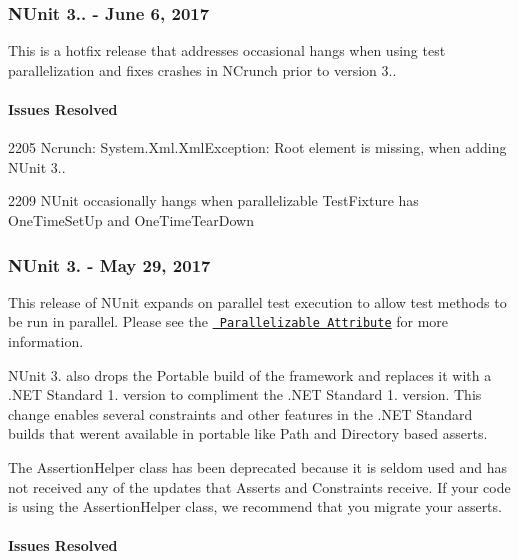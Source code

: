 \subsubsection*{N\+Unit 3.. -\/ June 6, 2017}

This is a hotfix release that addresses occasional hangs when using test parallelization and fixes crashes in N\+Crunch prior to version 3..

\paragraph*{Issues Resolved}


\begin{DoxyItemize}
\item 2205 Ncrunch\+: System.\+Xml.\+Xml\+Exception\+: Root element is missing, when adding N\+Unit 3..
\item 2209 N\+Unit occasionally hangs when parallelizable Test\+Fixture has One\+Time\+Set\+Up and One\+Time\+Tear\+Down
\end{DoxyItemize}

\subsubsection*{N\+Unit 3. -\/ May 29, 2017}

This release of N\+Unit expands on parallel test execution to allow test methods to be run in parallel. Please see the \href{https://github.com/nunit/docs/wiki/Parallelizable-Attribute}{\texttt{ Parallelizable Attribute}} for more information.

N\+Unit 3. also drops the Portable build of the framework and replaces it with a .N\+ET Standard 1. version to compliment the .N\+ET Standard 1. version. This change enables several constraints and other features in the .N\+ET Standard builds that weren\textquotesingle{}t available in portable like Path and Directory based asserts.

The Assertion\+Helper class has been deprecated because it is seldom used and has not received any of the updates that Asserts and Constraints receive. If your code is using the Assertion\+Helper class, we recommend that you migrate your asserts.

\paragraph*{Issues Resolved}


